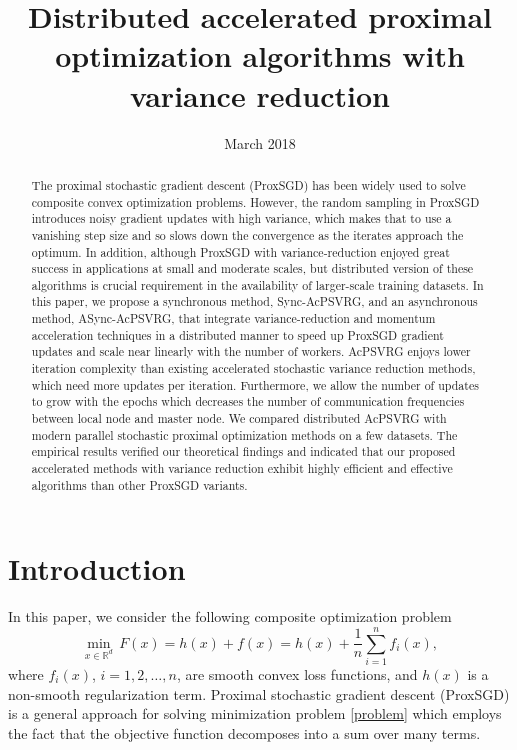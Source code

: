 \documentclass[10pt, conference, compsocconf]{IEEEtran}
\title{Distributed accelerated proximal optimization algorithms with variance reduction}
\date{March 2018}
\newcommand*{\R}{\mathbb{R}}
\theoremstyle{definition}
\theoremstyle{remark}
\begin{document}
\maketitle
\begin{abstract}
    The proximal stochastic gradient descent (ProxSGD) has been widely used to solve composite convex optimization problems. However, the random sampling in ProxSGD introduces noisy gradient updates with high variance, which makes that to use a vanishing step size and so slows down the convergence as the iterates approach the optimum.  In addition, although ProxSGD with variance-reduction enjoyed great success in applications at small and moderate scales, but distributed version of these algorithms is crucial requirement in the availability of larger-scale training datasets. In this paper, we propose a synchronous method, Sync-AcPSVRG, and an asynchronous method, ASync-AcPSVRG, that integrate variance-reduction and momentum acceleration techniques in a distributed manner to speed up  ProxSGD gradient updates and scale near linearly with the number of workers. AcPSVRG enjoys lower iteration  complexity than existing  accelerated  stochastic  variance  reduction  methods, which need more updates per iteration. Furthermore, we allow the number of updates to grow with the epochs which decreases the number of communication frequencies between local node and master node. We compared distributed AcPSVRG with modern parallel stochastic proximal optimization methods on a few datasets. The empirical results verified our theoretical findings and indicated that our proposed accelerated methods with variance reduction exhibit highly efficient and effective algorithms than other ProxSGD variants.
\end{abstract}


\section{Introduction}

In this paper, we consider the following composite optimization problem 
\begin{equation}\label{problem}
    \min_{x\in\R^d}\,F(x) = h(x) + f(x)= h(x) + \frac{1}{n} \sum_{i=1}^n f_i(x),
\end{equation}
where $f_i(x)$, $i=1,2,\ldots,n$, are smooth convex loss functions, and $h(x)$ is a non-smooth regularization term. Proximal stochastic gradient descent (ProxSGD) \cite{Nemirovski2009} is a general approach for solving minimization problem \eqref{problem} which employs the fact that the objective function decomposes into a sum over many terms. 
\end{document}
